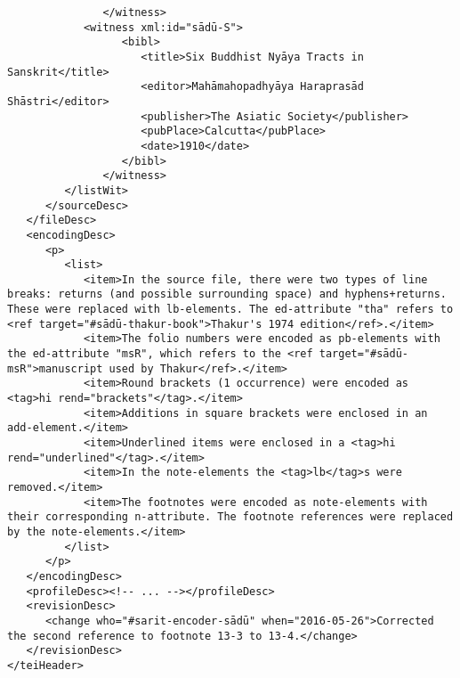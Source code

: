 \documentclass[article,12pt,a4paper]{memoir}%
\begin{document}
\begin{verbatim}
	           </witness>
            <witness xml:id="sādū-S">
	              <bibl>
	                 <title>Six Buddhist Nyāya Tracts in Sanskrit</title>
	                 <editor>Mahāmahopadhyāya Haraprasād Shāstri</editor>
	                 <publisher>The Asiatic Society</publisher>
	                 <pubPlace>Calcutta</pubPlace>
	                 <date>1910</date>
	              </bibl>
	           </witness>
         </listWit>
      </sourceDesc>
   </fileDesc>
   <encodingDesc>
      <p>
         <list>
            <item>In the source file, there were two types of line breaks: returns (and possible surrounding space) and hyphens+returns. These were replaced with lb-elements. The ed-attribute "tha" refers to <ref target="#sādū-thakur-book">Thakur's 1974 edition</ref>.</item>
            <item>The folio numbers were encoded as pb-elements with the ed-attribute "msR", which refers to the <ref target="#sādū-msR">manuscript used by Thakur</ref>.</item>
            <item>Round brackets (1 occurrence) were encoded as <tag>hi rend="brackets"</tag>.</item>
            <item>Additions in square brackets were enclosed in an add-element.</item>
            <item>Underlined items were enclosed in a <tag>hi rend="underlined"</tag>.</item>
            <item>In the note-elements the <tag>lb</tag>s were removed.</item>
            <item>The footnotes were encoded as note-elements with their corresponding n-attribute. The footnote references were replaced by the note-elements.</item>
         </list>
      </p>
   </encodingDesc>
   <profileDesc><!-- ... --></profileDesc>
   <revisionDesc>
      <change who="#sarit-encoder-sādū" when="2016-05-26">Corrected the second reference to footnote 13-3 to 13-4.</change>
   </revisionDesc>
</teiHeader>
	 \end{verbatim}
       
      \clearpage
      \begin{english}
      \printshorthands
      \printbibliography
      \end{english}
    
\end{document}
